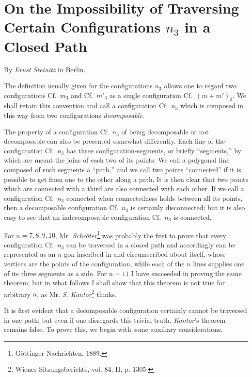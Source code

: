\documentclass[11pt,a4paper]{article}
\begin{document}
\newcommand{\Cf}{\ensuremath{\mathrm{Cf.}}}
\newcommand{\Cff}{\ensuremath{\mathrm{Cff.}}}

\section*{On the Impossibility of Traversing Certain Configurations $n_3$ in a Closed Path}
\begin{center}
By \emph{Ernst Steinitz} in Berlin.
\end{center}

The definition usually given for the configurations $n_3$ allows one to regard two configurations \Cf\ $m_3$ and \Cf\ $m'_3$ as a single configuration \Cf\ $(m+m')_3$. We shall retain this convention and call a configuration \Cf\ $n_3$ which is composed in this way from two configurations \emph{decomposable}.

The property of a configuration \Cf\ $n_3$ of being decomposable or not decomposable can also be presented somewhat differently. Each line of the configuration \Cf\ $n_3$ has three configuration-segments, or briefly “segments,” by which are meant the joins of each two of its points. We call a polygonal line composed of such segments a “path,” and we call two points “connected” if it is possible to get from one to the other along a path. It is then clear that two points which are connected with a third are also connected with each other. If we call a configuration \Cf\ $n_3$ connected when connectedness holds between all its points, then a decomposable configuration \Cf\ $n_3$ is certainly disconnected; but it is also easy to see that an indecomposable configuration \Cf\ $n_3$ is connected.

For $n=7,8,9,10$, Mr. \emph{Schröter}\footnote{Göttinger Nachrichten, 1889.} was probably the first to prove that every configuration \Cf\ $n_3$ can be traversed in a closed path and accordingly can be represented as an $n$-gon inscribed in and circumscribed about itself, whose vertices are the points of the configuration, while each of the $n$ lines supplies one of its three segments as a side. For $n=11$ I have succeeded in proving the same theorem; but in what follows I shall show that this theorem is not true for arbitrary $n$, as Mr. \emph{S. Kantor}\footnote{Wiener Sitzungsberichte, vol. 84, II, p. 1305.} thinks.

It is first evident that a decomposable configuration certainly cannot be traversed in one path; but even if one disregards this trivial truth, \emph{Kantor}'s theorem remains false. To prove this, we begin with some auxiliary considerations.
\end{document}

